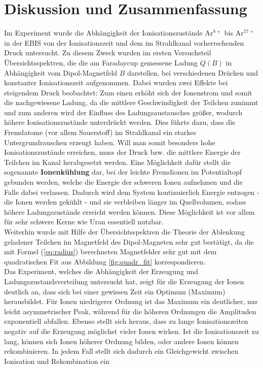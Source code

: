 \section{Diskussion und Zusammenfassung}
	Im Experiment wurde die Abhängigkeit der Ionisationszustände Ar$^{8+}$ bis Ar$^{17+}$ in der EBIS von der Ionisationszeit und dem im Strahlkanal vorherrschenden Druck untersucht. Zu diesem Zweck wurden im ersten Versuchsteil Übersichtsspektren, die die am Faradaycup gemessene Ladung $Q(B)$ in Abhängigkeit vom Dipol-Magnetfeld $B$ darstellen, bei verschiedenen Drücken und konstanter Ionisationszeit aufgenommen. Dabei wurden zwei Effekte bei steigendem Druck beobachtet: Zum einen erhöht sich der Ionenstrom und somit die nachgewiesene Ladung, da die mittlere Geschwindigkeit der Teilchen zunimmt und zum anderen wird der Einfluss des Ladungsaustausches größer, wodurch höhere Ionisationszustände unterdrückt werden. Dies führte dazu, dass die Fremdatome (vor allem Sauerstoff) im Strahlkanal ein starkes Untergrundrauschen erzeugt haben. Will man somit besonders hohe Ionisationszustände erreichen, muss der Druck bzw. die mittlere Energie der Teilchen im Kanal herabgesetzt werden. Eine Möglichkeit dafür stellt die sogenannte \textbf{Ionenkühlung} dar, bei der leichte Fremdionen im Potentialtopf gebunden werden, welche die Energie der schweren Ionen aufnehmen und die Falle dabei verlassen. Dadurch wird dem System kontinuierlich Energie entzogen - die Ionen werden gekühlt - und sie verbleiben länger im Quellvolumen, sodass höhere Ladungszustände erreicht werden können. Diese Möglichkeit ist vor allem für sehr schwere Kerne wie Uran essentiell nutzbar. \cite{PA}\\
	Weiterhin wurde mit Hilfe der Übersichtsspektren die Theorie der Ablenkung geladener Teilchen im Magnetfeld des Dipol-Magneten sehr gut bestätigt, da die mit Formel (\ref{eq:radius}) berechneten Magnetfelder sehr gut mit dem quadratischen Fit aus Abbildung \ref{fig:quadr_fit} korrespondieren.\\
	Das Experiment, welches die Abhängigkeit der Erzeugung und Ladungszustandsverteilung untersucht hat, zeigt für die Erzeugung der Ionen deutlich an, dass sich bei einer gewissen Zeit ein Optimum (Maximum) herausbildet. Für Ionen niedrigerer Ordnung ist das Maximum ein deutlicher, nur leicht asymmetrischer Peak, während für die höheren Ordnungen die Amplituden exponentiell abfallen. Ebenso stellt sich heraus, dass zu lange Ionisationszeiten negativ auf die Erzeugung möglichst vieler Ionen wirken. Ist die Ionisationszeit zu lang, können sich Ionen höherer Ordnung bilden, oder andere Ionen können rekombinieren. In jedem Fall stellt sich dadurch ein Gleichgewicht zwischen Ionisation und Rekombination ein\\
